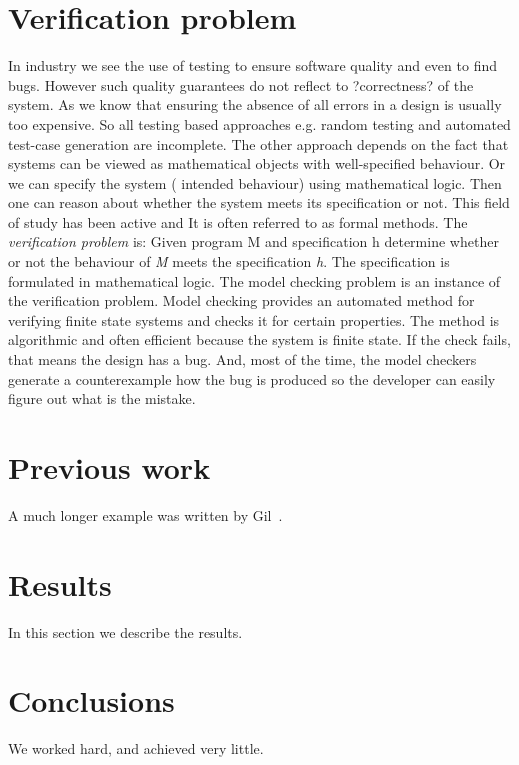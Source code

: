 \documentclass[14pt]{article}
\begin{document}
\section{Verification problem}\label{verification problem}
In industry we see the use of testing to ensure software quality and even to find bugs. However such quality guarantees do not reflect to ?correctness? of  the system. As we know that ensuring the absence of all errors in a design is usually too expensive. So all testing based approaches e.g. random testing and automated test-case generation are incomplete.  The other approach depends on the fact that systems can be viewed as mathematical objects with well-specified behaviour. Or we can specify the system ( intended behaviour) using mathematical logic. Then one can reason about whether the system meets its specification or not. This field of study has been active and It is often referred to as formal methods. The \textit{verification problem} is: Given program M and specification h determine whether or not the behaviour of \textit{M} meets the specification \textit{h}.  The specification is formulated in mathematical logic. The model checking problem is an instance of the verification problem. Model checking provides an automated method for verifying finite state systems and checks it for certain properties. The method is algorithmic and often efficient because the system is finite state. If the check fails, that means the design has a bug. And, most of the time, the model checkers generate a counterexample how the bug is produced so the developer can easily figure out what is the mistake.

\section{Previous work}\label{previous work}
A much longer \LaTeXe{} example was written by Gil~\cite{Gil:02}.


\section{Results}\label{results}
In this section we describe the results.

\section{Conclusions}\label{conclusions}
We worked hard, and achieved very little.



\end{document}

